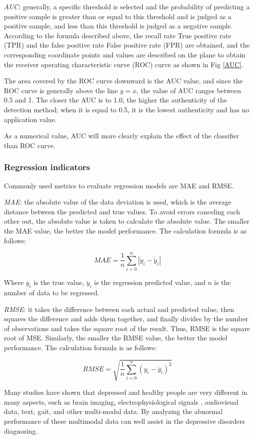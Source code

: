 \emph{AUC:} generally, a specific threshold is selected and the probability of predicting a positive sample is greater than or equal to this threshold and is judged as a positive sample, and less than this threshold is judged as a negative sample. According to the formula described above, the recall rate True positive rate (TPR) and the false positive rate False positive rate (FPR) are obtained, and the corresponding coordinate points and values are described on the plane to obtain the receiver operating characteristic curve (ROC) curve as shown in Fig \ref{AUC}.

The area covered by the ROC curve downward is the AUC value, and since the ROC curve is generally above the line $y=x$, the value of AUC ranges between 0.5 and 1. The closer the AUC is to 1.0, the higher the authenticity of the detection method; when it is equal to 0.5, it is the lowest authenticity and has no application value.

As a numerical value, AUC will more clearly explain the effect of the classifier than ROC curve.

\subsubsection{Regression indicators}
Commonly used metrics to evaluate regression models are MAE and RMSE.

\emph{MAE:} the absolute value of the data deviation is used, which is the average distance between the predicted and true values. To avoid errors canceling each other out, the absolute value is taken to calculate the absolute value. The smaller the MAE value, the better the model performance. The calculation formula is as follows:

\begin{equation}
MAE= \frac{1}{n} \sum_{i=0}^{n}\left | y_{i} -\breve{y}_{i}\right |
\end{equation}

Where $y_{i}$ is the true value, $\breve{y}_{i}$ is the regression predicted value, and $n$ is the number of data to be regressed.


\emph{RMSE:} it takes the difference between each actual and predicted value, then squares the difference and adds them together, and finally divides by the number of observations and takes the square root of the result. Thus, RMSE is the square root of MSE. Similarly, the smaller the RMSE value, the better the model performance. The calculation formula is as follows:

\begin{equation}
RMSE=\sqrt{\frac{1}{n} \sum_{i=0}^{n}\left (y_{i} -\breve{y}_{i}\right )^{2} }  
\end{equation}

Many studies have shown that depressed and healthy people are very different in many aspects, such as brain imaging, electrophysiological signals , audiovisual data, text, gait, and other multi-modal data. By analyzing the abnormal performance of these multimodal data can well assist in the depressive disorders diagnosing.